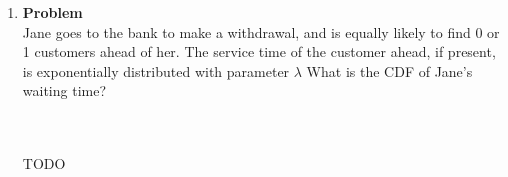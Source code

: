 \documentclass[12pt]{article}
\newenvironment{Ex}{\textbf{Problem}\vspace{.75em}\\}{}
\begin{document}
\begin{enumerate}
\begin{Ex}
\begin{enumerate}
    \item Suppose $Z$ has CDF $F_Z(z)$ described in
      \cref{fig:6-fig}. Find $F_X$ discrete, $F_Y$ continuous, and
      $\alpha$ for $Z$.
      \begin{figure}[h]
        \centering
        \caption{$F_Z(z)$}
        \label{fig:6-fig}
      \end{figure}
    \end{enumerate}
    \begin{solution} \hfill \\\\ {\huge TODO}
    \end{solution}
  \end{Ex}
\item
  \begin{Ex}
    Jane goes to the bank to make a withdrawal, and is equally likely
    to find 0 or 1 customers ahead of her. The service time of the
    customer ahead, if present, is exponentially distributed with
    parameter $\lambda$ What is the CDF of Jane's waiting time?
    \begin{solution} \hfill \\\\ {\huge TODO}
    \end{solution}
  \end{Ex}

\end{enumerate}
\end{document}
